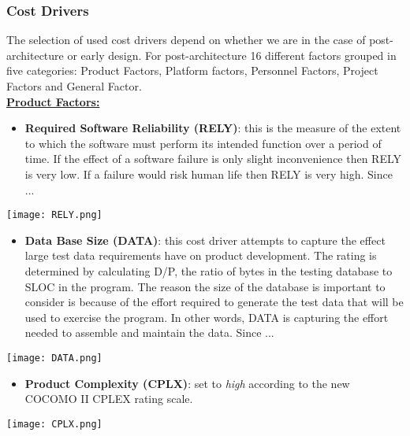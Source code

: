 \subsubsection{Cost Drivers}

The selection of used cost drivers depend on whether we are in the case of post-architecture or early design. For post-architecture 16 different factors grouped in five categories: Product Factors, Platform factors, Personnel Factors, Project Factors and General Factor.\\

\textbf{\underline{Product Factors:}}

\begin{itemize}
	\item \textbf{Required Software Reliability (RELY)}: this is the measure of the extent to which the software must perform its intended function over a period of time. If the effect of a software failure is only slight inconvenience then RELY is very low. If a failure would risk human life then RELY is very high. Since ... \todo{}
\end{itemize}
	\begin{center}
		\texttt{[image: RELY.png]}
	\end{center}

\begin{itemize}
	\item \textbf{Data Base Size (DATA)}: this cost driver attempts to capture the effect large test data requirements have on product development. The rating is determined by calculating D/P, the ratio of bytes in the testing database to SLOC in the program. The reason the size of the database is important to
	consider is because of the effort required to generate the test data that will be used to exercise the
	program. In other words, DATA is capturing the effort needed to assemble and maintain the data.  Since ... \todo{}
\end{itemize}
\begin{center}
	\texttt{[image: DATA.png]}
\end{center}

\begin{itemize}
	\item \textbf{Product Complexity (CPLX)}: set to \textit{high} according to the new COCOMO II CPLEX rating scale.
\end{itemize}
\begin{center}
	\texttt{[image: CPLX.png]}
\end{center}	

